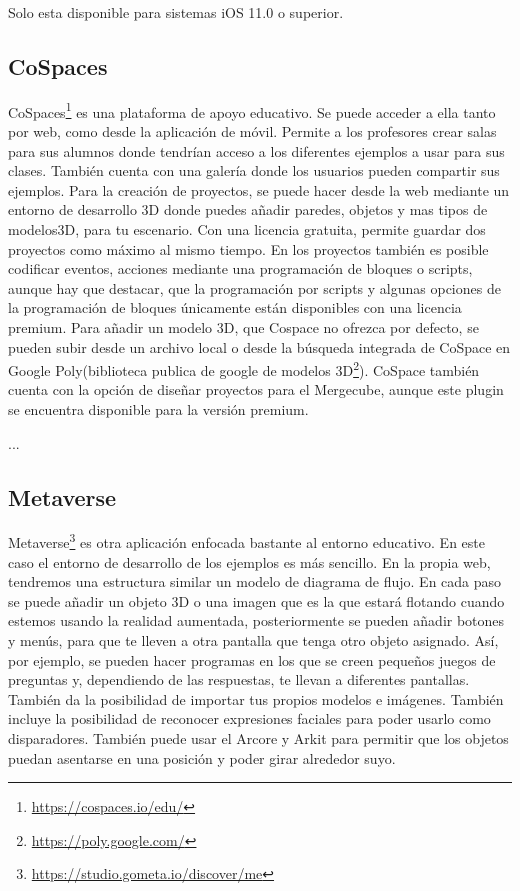 Solo esta disponible para sistemas iOS 11.0 o superior.


\subsection{CoSpaces} CoSpaces\footnote{\url{https://cospaces.io/edu/}} es una plataforma de apoyo educativo. Se puede acceder a ella tanto por web, como desde la aplicación de móvil. Permite a los profesores crear salas para sus alumnos donde tendrían acceso a los diferentes ejemplos a usar para sus clases. También cuenta con una galería donde los usuarios pueden compartir sus ejemplos.
Para la creación de proyectos, se puede hacer desde la web mediante un entorno de desarrollo 3D donde puedes añadir paredes, objetos y mas tipos de modelos3D, para tu escenario. Con una licencia gratuita, permite guardar dos proyectos como máximo al mismo tiempo. En los proyectos también es posible codificar eventos, acciones mediante una programación de bloques o scripts, aunque hay que destacar, que la programación por scripts y algunas opciones de la programación de bloques únicamente están disponibles con una licencia premium. Para añadir un modelo 3D, que Cospace no ofrezca por defecto, se pueden subir desde un archivo local o desde la búsqueda integrada de CoSpace en Google Poly(biblioteca publica de google de modelos 3D\footnote{\url{https://poly.google.com/}}).
CoSpace también cuenta con la opción de diseñar proyectos para el Mergecube, aunque este plugin se encuentra disponible para la versión premium.

...

\subsection{Metaverse} Metaverse\footnote{\url{https://studio.gometa.io/discover/me}} es otra aplicación enfocada bastante al entorno educativo. En este caso el entorno de desarrollo de los ejemplos es más sencillo. En la propia web, tendremos una estructura similar un modelo de diagrama de flujo. En cada paso se puede añadir un objeto 3D o una imagen que es la que estará flotando cuando estemos usando la realidad aumentada, posteriormente se pueden añadir botones y menús, para que te lleven a otra pantalla que tenga otro objeto asignado. Así, por ejemplo, se pueden hacer programas en los que se creen pequeños juegos de preguntas y, dependiendo de las respuestas, te llevan a diferentes pantallas.
También da la posibilidad de importar tus propios modelos e imágenes.
También incluye la posibilidad de reconocer expresiones faciales para poder usarlo como disparadores.
También puede usar el Arcore y Arkit para permitir que los objetos puedan asentarse en una posición y poder girar alrededor suyo.

